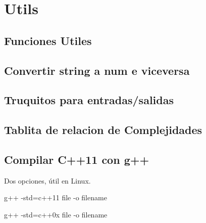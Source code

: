 \section{Utils}
\subsection{Funciones Utiles}

\subsection{Convertir string a num e viceversa}

\subsection{Truquitos para entradas/salidas}

\subsection{Tablita de relacion de Complejidades}

\subsection{Compilar C++11 con g++}
Dos opciones, \'util en Linux.
\begin{code}
g++ -std=c++11 {file} -o {filename}

g++ -std=c++0x {file} -o {filename}
\end{code}
